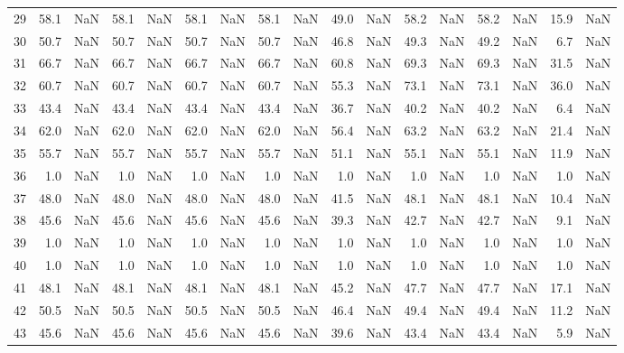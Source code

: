 \begin{tabular}{lrrrrrrrrrrrrrrrr}
     29 & 58.1 & NaN &  58.1 &   NaN &  58.1 &   NaN &  58.1 &   NaN &  49.0 &   NaN &  58.2 &   NaN &  58.2 &   NaN &  15.9 &   NaN \\
     30 & 50.7 & NaN &  50.7 &   NaN &  50.7 &   NaN &  50.7 &   NaN &  46.8 &   NaN &  49.3 &   NaN &  49.2 &   NaN &   6.7 &   NaN \\
     31 & 66.7 & NaN &  66.7 &   NaN &  66.7 &   NaN &  66.7 &   NaN &  60.8 &   NaN &  69.3 &   NaN &  69.3 &   NaN &  31.5 &   NaN \\
     32 & 60.7 & NaN &  60.7 &   NaN &  60.7 &   NaN &  60.7 &   NaN &  55.3 &   NaN &  73.1 &   NaN &  73.1 &   NaN &  36.0 &   NaN \\
     33 & 43.4 & NaN &  43.4 &   NaN &  43.4 &   NaN &  43.4 &   NaN &  36.7 &   NaN &  40.2 &   NaN &  40.2 &   NaN &   6.4 &   NaN \\
     34 & 62.0 & NaN &  62.0 &   NaN &  62.0 &   NaN &  62.0 &   NaN &  56.4 &   NaN &  63.2 &   NaN &  63.2 &   NaN &  21.4 &   NaN \\
     35 & 55.7 & NaN &  55.7 &   NaN &  55.7 &   NaN &  55.7 &   NaN &  51.1 &   NaN &  55.1 &   NaN &  55.1 &   NaN &  11.9 &   NaN \\
     36 &  1.0 & NaN &   1.0 &   NaN &   1.0 &   NaN &   1.0 &   NaN &   1.0 &   NaN &   1.0 &   NaN &   1.0 &   NaN &   1.0 &   NaN \\
     37 & 48.0 & NaN &  48.0 &   NaN &  48.0 &   NaN &  48.0 &   NaN &  41.5 &   NaN &  48.1 &   NaN &  48.1 &   NaN &  10.4 &   NaN \\
     38 & 45.6 & NaN &  45.6 &   NaN &  45.6 &   NaN &  45.6 &   NaN &  39.3 &   NaN &  42.7 &   NaN &  42.7 &   NaN &   9.1 &   NaN \\
     39 &  1.0 & NaN &   1.0 &   NaN &   1.0 &   NaN &   1.0 &   NaN &   1.0 &   NaN &   1.0 &   NaN &   1.0 &   NaN &   1.0 &   NaN \\
     40 &  1.0 & NaN &   1.0 &   NaN &   1.0 &   NaN &   1.0 &   NaN &   1.0 &   NaN &   1.0 &   NaN &   1.0 &   NaN &   1.0 &   NaN \\
     41 & 48.1 & NaN &  48.1 &   NaN &  48.1 &   NaN &  48.1 &   NaN &  45.2 &   NaN &  47.7 &   NaN &  47.7 &   NaN &  17.1 &   NaN \\
     42 & 50.5 & NaN &  50.5 &   NaN &  50.5 &   NaN &  50.5 &   NaN &  46.4 &   NaN &  49.4 &   NaN &  49.4 &   NaN &  11.2 &   NaN \\
     43 & 45.6 & NaN &  45.6 &   NaN &  45.6 &   NaN &  45.6 &   NaN &  39.6 &   NaN &  43.4 &   NaN &  43.4 &   NaN &   5.9 &   NaN \\

\end{tabular}
